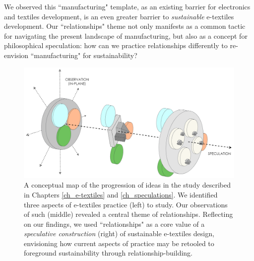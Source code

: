 We observed this ``manufacturing" template, as an existing barrier for electronics and textiles development, is an even greater barrier to \textit{sustainable} e-textiles development. Our ``relationships" theme not only manifests as a common tactic for navigating the present landscape of manufacturing, but also as a concept for philosophical speculation: how can we practice relationships differently to re-envision ``manufacturing" for sustainability? 

\begin{figure}[h!]
  \centering
  \includegraphics[width=\textwidth]{figs/EST_Discussion.png}
  \caption[Conceptual map of the progression of ideas in the E-Textiles \& Speculations study.]{%
  A conceptual map of the progression of ideas in the study described in Chapters \ref{ch_e-textiles} and \ref{ch_speculations}. We identified three aspects of e-textiles practice (left) to study. Our observations of such (middle) revealed a central theme of relationships. Reflecting on our findings, we used ``relationships" as a core value of a \textit{speculative construction} (right) of sustainable e-textiles design, envisioning how current aspects of practice may be retooled to foreground sustainability through relationship-building.}
  \label{fig:spec-visioning}
\end{figure}

